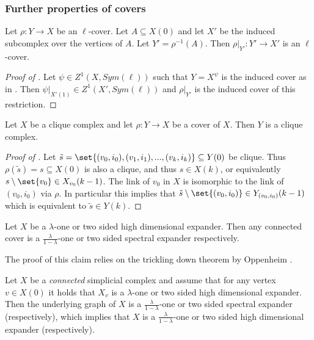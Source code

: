 \subsubsection{Further properties of covers}
\begin{claim} \label{claim:restriction-of-cover}
Let \(\rho:Y \to X\) be an \(\ell\)-cover. Let \(A \subseteq X(0)\) and let \(X'\) be the induced subcomplex over the vertices of \(A\). Let \(Y'=\rho^{-1}(A)\). Then \(\rho|_{Y'}:Y' \to X'\) is an \(\ell\)-cover.
\end{claim}

\begin{proof}[Proof of ]
    Let \(\psi \in Z^1(X,Sym(\ell))\) such that \(Y=X^\psi\) is the induced cover as in . Then \(\psi|_{X'(1)} \in Z^1(X',Sym(\ell))\) and \(\rho|_{Y'}\) is the induced cover of this restriction.
\end{proof}


\begin{claim}\label{claim:cover-of-clique-complex}
    Let \(X\) be a clique complex and let \(\rho:Y\to X\) be a cover of \(X\). Then \(Y\) is a clique complex.
\end{claim}

\begin{proof}[Proof of ]
    Let \(\tilde{s} = \set{(v_0,i_0),(v_1,i_1),...,(v_k,i_k)} \subseteq Y(0)\) be clique. Thus \(\rho(\tilde{s}) = s \subseteq X(0)\) is also a clique, and thus \(s \in X(k)\), or equivalently \(s \setminus \set{v_0} \in X_{v_0}(k-1)\). The link of \(v_0\) in \(X\) is isomorphic to the link of \((v_0,i_0)\) via \(\rho\). In particular this implies that \(\tilde{s} \setminus \set{(v_0,i_0)} \in Y_{(v_0,i_0)}(k-1)\) which is equivalent to \(\tilde{s} \in Y(k)\).
\end{proof}

\begin{claim} \label{claim:expansion-of-cover}
    Let \(X\) be a \(\lambda\)-one or two sided high dimensional expander. Then any connected cover is a \(\frac{\lambda}{1-\lambda}\)-one or two sided spectral expander respectively.
\end{claim}

The proof of this claim relies on the trickling down theorem by Oppenheim \cite{Oppenheim2018}.

\begin{theorem} \label{thm:trickle-down}
    Let \(X\) be a \emph{connected} simplicial complex and assume that for any vertex \(v \in X(0)\) it holds that \(X_v\) is a \(\lambda\)-one or two sided high dimensional expander. Then the underlying graph of \(X\) is a \(\frac{\lambda}{1-\lambda}\)-one or two sided spectral expander (respectively), which implies that \(X\) is a \(\frac{\lambda}{1-\lambda}\)-one or two sided high dimensional expander (respectively).
\end{theorem}

